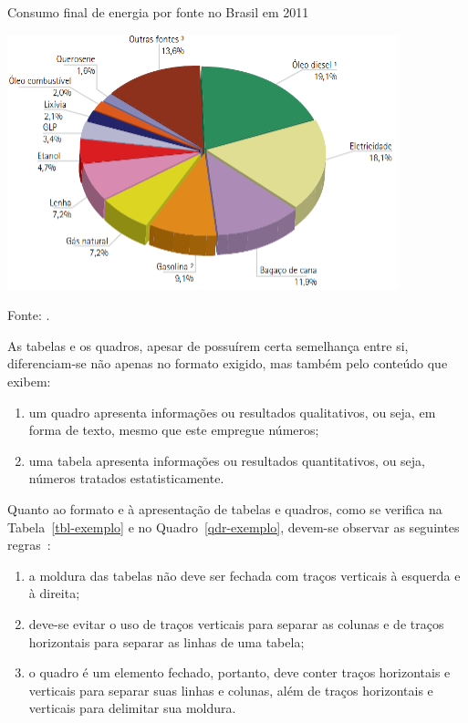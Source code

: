 \documentclass[10pt, a4paper]{article}
\begin{document}
\begin{grafico}[h!]
	\centering
	\caption{Consumo final de energia por fonte no Brasil em 2011}
	\label{graf-exemplo}
	\includegraphics[width=.75\textwidth]{graf-exemplo}	
	\caption*{Fonte: \cite{epe:ben2011}.}
\end{grafico}

As tabelas e os quadros, apesar de possuírem certa semelhança entre si, diferenciam-se não apenas no formato exigido, mas também pelo conteúdo que exibem:

\begin{enumerate}[label=\alph*)]
	\item um quadro apresenta informações ou resultados qualitativos, ou seja, em forma de texto, mesmo que este empregue números;
	\item uma tabela apresenta informações ou resultados quantitativos, ou seja, números tratados estatisticamente.
\end{enumerate}

Quanto ao formato e à apresentação de tabelas e quadros, como se verifica na Tabela~\ref{tbl-exemplo} e no Quadro~\ref{qdr-exemplo}, devem-se observar as seguintes regras~\citep{fibge:nat1993}:

\begin{enumerate}[label=\alph*)]
	\item a moldura das tabelas não deve ser fechada com traços verticais à esquerda e à direita;
	\item deve-se evitar o uso de traços verticais para separar as colunas e de traços horizontais para separar as linhas de uma tabela;
	\item o quadro é um elemento fechado, portanto, deve conter traços horizontais e verticais para separar suas linhas e colunas, além de traços horizontais e verticais para delimitar sua moldura.
\end{enumerate}
\end{document}
